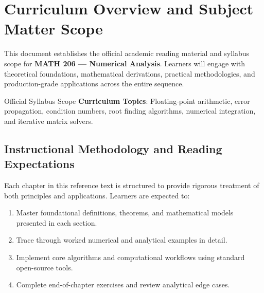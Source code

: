 \section{Curriculum Overview and Subject Matter Scope}

This document establishes the official academic reading material and syllabus scope for \textbf{MATH 206 --- Numerical Analysis}. Learners will engage with theoretical foundations, mathematical derivations, practical methodologies, and production-grade applications across the entire sequence.

\begin{InsightBox}{Official Syllabus Scope}
  \textbf{Curriculum Topics}: Floating-point arithmetic, error propagation, condition numbers, root finding algorithms, numerical integration, and iterative matrix solvers.
\end{InsightBox}

\subsection{Instructional Methodology and Reading Expectations}

Each chapter in this reference text is structured to provide rigorous treatment of both principles and applications. Learners are expected to:
\begin{enumerate}
  \item Master foundational definitions, theorems, and mathematical models presented in each section.
  \item Trace through worked numerical and analytical examples in detail.
  \item Implement core algorithms and computational workflows using standard open-source tools.
  \item Complete end-of-chapter exercises and review analytical edge cases.
\end{enumerate}

